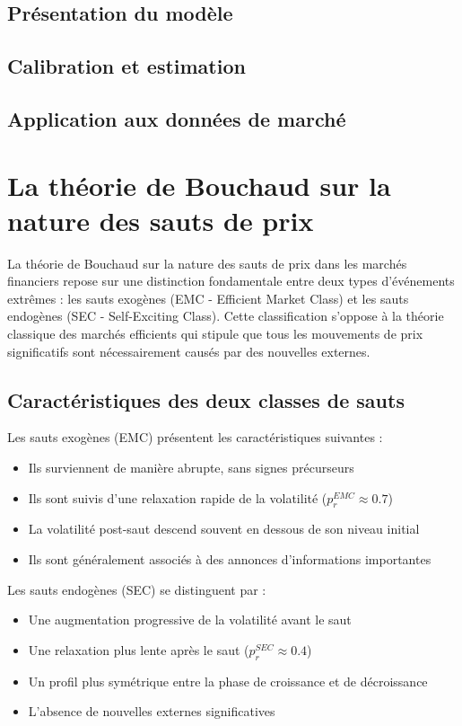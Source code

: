 \documentclass[10pt,a4paper]{article}
\theoremstyle{definition}
\theoremstyle{remark}
\begin{document}
\begin{itemize}
\subsection{Présentation du modèle}

\subsection{Calibration et estimation}

\subsection{Application aux données de marché}

\newpage
\section{La théorie de Bouchaud sur la nature des sauts de prix}

La théorie de Bouchaud sur la nature des sauts de prix dans les marchés financiers repose sur une distinction fondamentale entre deux types d'événements extrêmes : les sauts exogènes (EMC - Efficient Market Class) et les sauts endogènes (SEC - Self-Exciting Class). Cette classification s'oppose à la théorie classique des marchés efficients qui stipule que tous les mouvements de prix significatifs sont nécessairement causés par des nouvelles externes.

\subsection{Caractéristiques des deux classes de sauts}

Les sauts exogènes (EMC) présentent les caractéristiques suivantes :
\begin{itemize}
    \item Ils surviennent de manière abrupte, sans signes précurseurs
    \item Ils sont suivis d'une relaxation rapide de la volatilité ($p_r^{EMC} \approx 0.7$)
    \item La volatilité post-saut descend souvent en dessous de son niveau initial
    \item Ils sont généralement associés à des annonces d'informations importantes
\end{itemize}

Les sauts endogènes (SEC) se distinguent par :
\begin{itemize}
    \item Une augmentation progressive de la volatilité avant le saut
    \item Une relaxation plus lente après le saut ($p_r^{SEC} \approx 0.4$)
    \item Un profil plus symétrique entre la phase de croissance et de décroissance
    \item L'absence de nouvelles externes significatives
\end{itemize}


\end{itemize}
\end{document}
